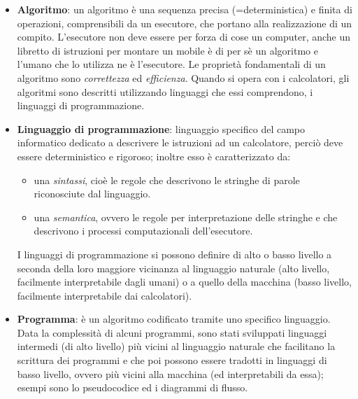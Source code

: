 \begin{itemize}
	\item\textbf{Algoritmo}: un algoritmo è una sequenza precisa (=deterministica) e finita di operazioni, comprensibili da un esecutore, che portano alla realizzazione di un compito. L'esecutore non deve essere per forza di cose un computer, anche un libretto di istruzioni per montare un mobile è di per sè un algoritmo e l'umano che lo utilizza ne è l'esecutore.
	Le proprietà fondamentali di un algoritmo sono \textit{correttezza} ed \textit{efficienza}. Quando si opera con i calcolatori, gli algoritmi sono descritti utilizzando linguaggi che essi comprendono, i linguaggi di programmazione. 

	\item\textbf{Linguaggio di programmazione}: linguaggio specifico del campo informatico dedicato a descrivere le istruzioni ad un calcolatore, perciò deve essere deterministico e rigoroso; inoltre esso è caratterizzato da: 
	\begin{itemize}[noitemsep, nolistsep]
	    \item una \textit{sintassi}, cioè le regole che descrivono le stringhe di parole riconosciute dal linguaggio.
	    \item una \textit{semantica}, ovvero le regole per interpretazione delle stringhe e che descrivono i processi computazionali dell'esecutore.
	\end{itemize}
    I linguaggi di programmazione si possono definire di alto o basso livello a seconda della loro maggiore vicinanza al linguaggio naturale (alto livello, facilmente interpretabile dagli umani) o a quello della macchina (basso livello, facilmente interpretabile dai calcolatori).

	\item\textbf{Programma}: è un algoritmo codificato tramite uno specifico linguaggio. 
	Data la complessità di alcuni programmi, sono stati sviluppati linguaggi intermedi (di alto livello) più vicini al linguaggio naturale che facilitano la scrittura dei programmi e che poi possono essere tradotti in linguaggi di basso livello, ovvero più vicini alla macchina (ed interpretabili da essa); esempi sono lo pseudocodice ed i diagrammi di flusso.
\end{itemize}


